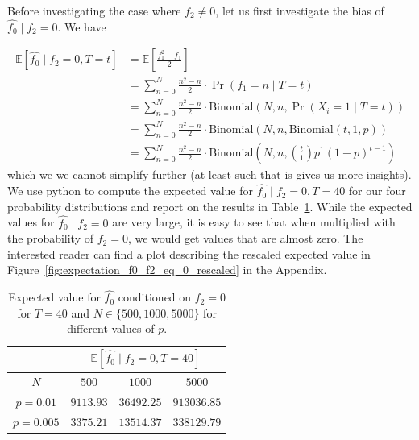 Before investigating the case where $f_2\neq 0$, let us first investigate the bias of $\hat{f_0}\mid f_2 = 0$.
We have 
{
\allowdisplaybreaks
\begin{align*}
    \mathbb{E}\left[ \hat{f_0} \mid f_2 = 0, T=t \right] &= \mathbb{E}\left[ \frac{f_1^2 - f_1}{2} \right] \\ 
    &= \sum_{n=0}^N \frac{n^2 - n}{2} \cdot \Pr(f_1 = n \mid T=t) \\
    &= \sum_{n=0}^N \frac{n^2 - n}{2} \cdot \mathrm{Binomial}(N, n, \Pr(X_i = 1 \mid T=t)) \\
    &= \sum_{n=0}^N \frac{n^2 - n}{2} \cdot \mathrm{Binomial}(N, n, \mathrm{Binomial}(t, 1, p)) \\
    &= \sum_{n=0}^N \frac{n^2 - n}{2} \cdot \mathrm{Binomial}(N, n, \binom{t}{1} p^1 {(1-p)}^{t-1})
\end{align*}
which we we cannot simplify further (at least such that is gives us more insights). We use python to compute the expected value for $\hat{f_0} \mid f_2 = 0, T=40$ for our four probability distributions and report on the results in Table~\ref{tab:expected_value_f0_f2_eq_0}. While the expected values for $\hat{f_0}\mid f_2 = 0$ are very large, it is easy to see that when multiplied with the probability of $f_2 = 0$, we would get values that are almost zero. The interested reader can find a plot describing the rescaled expected value in Figure~\ref{fig:expectation_f0_f2_eq_0_rescaled} in the Appendix.


\begin{table}[t]
    \centering
    \begin{tabular}{c|c c c}
        \toprule
         & \multicolumn{3}{c}{$\mathbb{E}[\hat{f_0} \mid f_2 = 0, T=40]$} \\
        \midrule
        $N$ & $500$ & $1000$ & $5000$ \\
        \midrule
        $p=0.01$  & $9113.93$   & $36492.25$  & $913036.85$ \\
        $p=0.005$ & $3375.21$   & $13514.37$  & $338129.79$ \\
    \end{tabular}
    \caption{Expected value for $\hat{f_0}$ conditioned on $f_2 = 0$ for $T=40$ and $N \in \{500, 1000, 5000\}$ for different values of $p$.}
    \label{tab:expected_value_f0_f2_eq_0}
\end{table}
}

